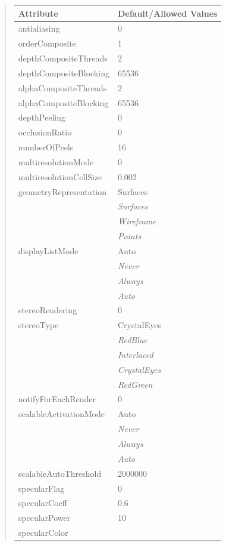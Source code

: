 \documentclass[letterpaper,10pt,english]{sphinxmanual}
\begin{document}
\begin{quote}
\begin{longtable}{|l|l|}
\textbf{Attribute}
 & 
\textbf{Default/Allowed Values}
\\
\hline
antialiasing
 & 
0
\\
\hline
orderComposite
 & 
1
\\
\hline
depthCompositeThreads
 & 
2
\\
\hline
depthCompositeBlocking
 & 
65536
\\
\hline
alphaCompositeThreads
 & 
2
\\
\hline
alphaCompositeBlocking
 & 
65536
\\
\hline
depthPeeling
 & 
0
\\
\hline
occlusionRatio
 & 
0
\\
\hline
numberOfPeels
 & 
16
\\
\hline
multiresolutionMode
 & 
0
\\
\hline
multiresolutionCellSize
 & 
0.002
\\
\hline
geometryRepresentation
 & 
Surfaces
\\
\hline & 
\emph{Surfaces}
\\
\hline & 
\emph{Wireframe}
\\
\hline & 
\emph{Points}
\\
\hline
displayListMode
 & 
Auto
\\
\hline & 
\emph{Never}
\\
\hline & 
\emph{Always}
\\
\hline & 
\emph{Auto}
\\
\hline
stereoRendering
 & 
0
\\
\hline
stereoType
 & 
CrystalEyes
\\
\hline & 
\emph{RedBlue}
\\
\hline & 
\emph{Interlaced}
\\
\hline & 
\emph{CrystalEyes}
\\
\hline & 
\emph{RedGreen}
\\
\hline
notifyForEachRender
 & 
0
\\
\hline
scalableActivationMode
 & 
Auto
\\
\hline & 
\emph{Never}
\\
\hline & 
\emph{Always}
\\
\hline & 
\emph{Auto}
\\
\hline
scalableAutoThreshold
 & 
2000000
\\
\hline
specularFlag
 & 
0
\\
\hline
specularCoeff
 & 
0.6
\\
\hline
specularPower
 & 
10
\\
\hline
specularColor
 & 

\end{longtable}
\end{quote}
\end{document}
